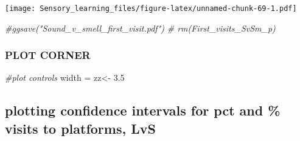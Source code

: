 \documentclass[]{article}
\newenvironment{Shaded}{\begin{snugshade}}{\end{snugshade}}
\newcommand{\FloatTok}[1]{\textcolor[rgb]{0.00,0.00,0.81}{{#1}}}
\newcommand{\StringTok}[1]{\textcolor[rgb]{0.31,0.60,0.02}{{#1}}}
\newcommand{\CommentTok}[1]{\textcolor[rgb]{0.56,0.35,0.01}{\textit{{#1}}}}
\newcommand{\NormalTok}[1]{{#1}}
\begin{document}
\texttt{[image: Sensory\_learning\_files/figure-latex/unnamed-chunk-69-1.pdf]}

\begin{Shaded}
\begin{Highlighting}[]
  \CommentTok{#ggsave("Sound_v_smell_first_visit.pdf")}
 \CommentTok{# rm(First_visits_SvSm_p)}
\end{Highlighting}
\end{Shaded}

\subsubsection{PLOT CORNER}\label{plot-corner}

\begin{Shaded}
\begin{Highlighting}[]
\CommentTok{#plot controls}
\NormalTok{width =}\StringTok{ }\NormalTok{zz<-}\StringTok{  }\FloatTok{3.5}
\end{Highlighting}
\end{Shaded}

\subsection{plotting confidence intervals for pct and \% visits to
platforms,
LvS}\label{plotting-confidence-intervals-for-pct-and-visits-to-platforms-lvs-1}
\end{document}
